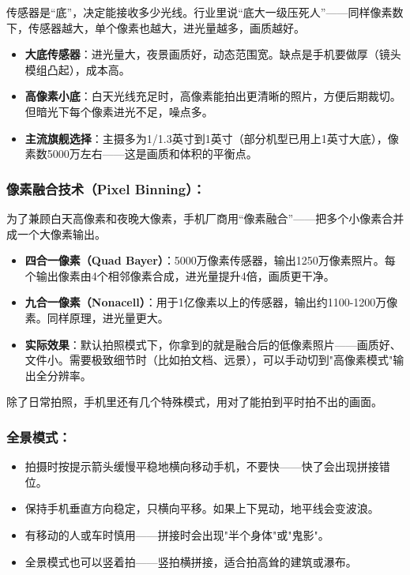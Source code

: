 传感器是“底”，决定能接收多少光线。行业里说“底大一级压死人”——同样像素数下，传感器越大，单个像素也越大，进光量越多，画质越好。

\begin{itemize}
  \item \textbf{大底传感器}：进光量大，夜景画质好，动态范围宽。缺点是手机要做厚（镜头模组凸起），成本高。
  \item \textbf{高像素小底}：白天光线充足时，高像素能拍出更清晰的照片，方便后期裁切。但暗光下每个像素进光不足，噪点多。
  \item \textbf{主流旗舰选择}：主摄多为1/1.3英寸到1英寸（部分机型已用上1英寸大底），像素数5000万左右——这是画质和体积的平衡点。
\end{itemize}

\subsubsection*{像素融合技术（Pixel Binning）：}

为了兼顾白天高像素和夜晚大像素，手机厂商用“像素融合”——把多个小像素合并成一个大像素输出。

\begin{itemize}
  \item \textbf{四合一像素（Quad Bayer）}：5000万像素传感器，输出1250万像素照片。每个输出像素由4个相邻像素合成，进光量提升4倍，画质更干净。
  \item \textbf{九合一像素（Nonacell）}：用于1亿像素以上的传感器，输出约1100-1200万像素。同样原理，进光量更大。
  \item \textbf{实际效果}：默认拍照模式下，你拿到的就是融合后的低像素照片——画质好、文件小。需要极致细节时（比如拍文档、远景），可以手动切到"高像素模式"输出全分辨率。
\end{itemize}


除了日常拍照，手机里还有几个特殊模式，用对了能拍到平时拍不出的画面。

\subsubsection*{全景模式：}

\begin{itemize}
  \item 拍摄时按提示箭头缓慢平稳地横向移动手机，不要快——快了会出现拼接错位。
  \item 保持手机垂直方向稳定，只横向平移。如果上下晃动，地平线会变波浪。
  \item 有移动的人或车时慎用——拼接时会出现"半个身体"或"鬼影"。
  \item 全景模式也可以竖着拍——竖拍横拼接，适合拍高耸的建筑或瀑布。
\end{itemize}

